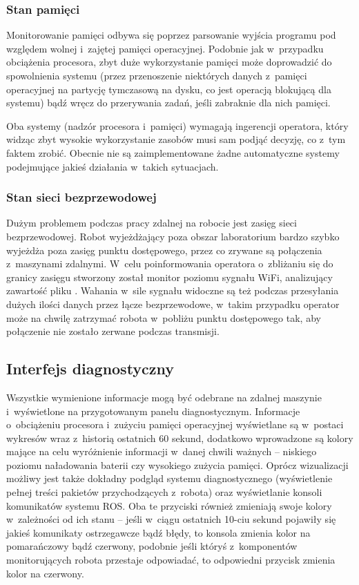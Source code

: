 \subsubsection{Stan pamięci}

Monitorowanie pamięci odbywa się poprzez parsowanie wyjścia programu 
pod względem wolnej i~zajętej pamięci operacyjnej. Podobnie jak w~przypadku
obciążenia procesora, zbyt duże wykorzystanie pamięci może doprowadzić do
spowolnienia systemu (przez przenoszenie niektórych danych z~pamięci
operacyjnej na partycję tymczasową na dysku, co jest operacją blokującą dla
systemu) bądź wręcz do przerywania zadań, jeśli zabraknie dla nich pamięci.

Oba systemy (nadzór procesora i~pamięci) wymagają ingerencji operatora, który
widząc zbyt wysokie wykorzystanie zasobów musi sam podjąć decyzję, co z~tym
faktem zrobić. Obecnie nie są zaimplementowane żadne automatyczne systemy
podejmujące jakieś działania w~takich sytuacjach.

\subsubsection{Stan sieci bezprzewodowej}

Dużym problemem podczas pracy zdalnej na robocie jest zasięg sieci
bezprzewodowej. Robot wyjeżdżający poza obszar laboratorium bardzo szybko
wyjeżdża poza zasięg punktu dostępowego, przez co zrywane są połączenia 
z~maszynami zdalnymi. W~celu poinformowania operatora o~zbliżaniu się do granicy
zasięgu stworzony został monitor poziomu sygnału WiFi, analizujący zawartość
pliku . Wahania w~sile sygnału widoczne są też podczas
przesyłania dużych ilości danych przez łącze bezprzewodowe, w~takim przypadku
operator może na chwilę zatrzymać robota w~pobliżu punktu dostępowego tak, aby
połączenie nie zostało zerwane podczas transmisji.

\subsection{Interfejs diagnostyczny}

Wszystkie wymienione informacje mogą być odebrane na zdalnej maszynie 
i~wyświetlone na przygotowanym panelu diagnostycznym. Informacje o~obciążeniu
procesora i~zużyciu pamięci operacyjnej wyświetlane są w~postaci wykresów
wraz z~historią ostatnich 60 sekund, dodatkowo wprowadzone są kolory mające
na celu wyróżnienie informacji w~danej chwili ważnych -- niskiego poziomu
naładowania baterii czy wysokiego zużycia pamięci. Oprócz wizualizacji
możliwy jest także dokładny podgląd systemu diagnostycznego (wyświetlenie
pełnej treści pakietów przychodzących z~robota) oraz wyświetlanie konsoli
komunikatów systemu ROS. Oba te przyciski również zmieniają swoje kolory
w~zależności od ich stanu -- jeśli w~ciągu ostatnich 10-ciu sekund pojawiły
się jakieś komunikaty ostrzegawcze bądź błędy, to konsola zmienia kolor na
pomarańczowy bądź czerwony, podobnie jeśli któryś z~komponentów monitorujących
robota przestaje odpowiadać, to odpowiedni przycisk zmienia kolor na czerwony.

